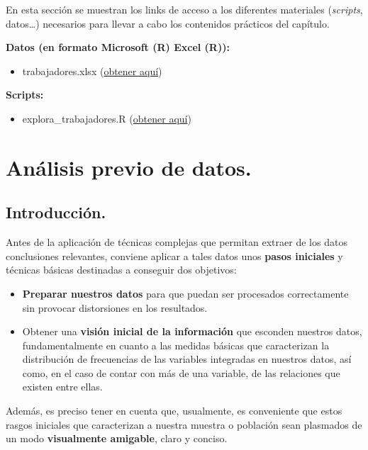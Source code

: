 \documentclass[
]{book}
\providecommand{\tightlist}{%
  \setlength{\itemsep}{0pt}\setlength{\parskip}{0pt}}
\begin{document}
En esta sección se muestran los links de acceso a los diferentes materiales (\emph{scripts}, datos\ldots) necesarios para llevar a cabo los contenidos prácticos del capítulo.

\textbf{Datos (en formato Microsoft (R) Excel (R)):}

\begin{itemize}
\tightlist
\item
  trabajadores.xlsx (\href{https://docs.google.com/spreadsheets/d/1e_h8P_0sBuD5Nvw6nkeWtXXeiqItFfdI/edit?usp=sharing&ouid=115375878280465826079&rtpof=true&sd=true}{obtener aquí})
\end{itemize}

\textbf{Scripts:}

\begin{itemize}
\tightlist
\item
  explora\_trabajadores.R (\href{https://drive.google.com/file/d/1pfyGPGQRmgOyo9wrZ7fr_KAFj49ecXID/view?usp=sharing}{obtener aquí})
\end{itemize}

\chapter{Análisis previo de datos.}\label{anuxe1lisis-previo-de-datos.}

\section{Introducción.}\label{introducciuxf3n.-1}

Antes de la aplicación de técnicas complejas que permitan extraer de los datos conclusiones relevantes, conviene aplicar a tales datos unos \textbf{pasos iniciales} y técnicas básicas destinadas a conseguir dos objetivos:

\begin{itemize}
\item
  \textbf{Preparar nuestros datos} para que puedan ser procesados correctamente sin provocar distorsiones en los resultados.
\item
  Obtener una \textbf{visión inicial de la información} que esconden nuestros datos, fundamentalmente en cuanto a las medidas básicas que caracterizan la distribución de frecuencias de las variables integradas en nuestros datos, así como, en el caso de contar con más de una variable, de las relaciones que existen entre ellas.
\end{itemize}

Además, es preciso tener en cuenta que, usualmente, es conveniente que estos rasgos iniciales que caracterizan a nuestra muestra o población sean plasmados de un modo \textbf{visualmente amigable}, claro y conciso.
\end{document}
